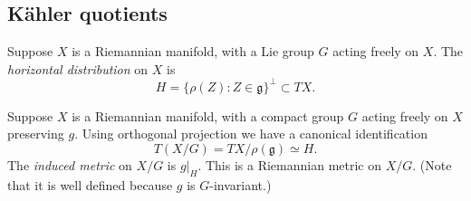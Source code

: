 \documentclass[12pt,letterpaper,reqno]{article}
\numberwithin{equation}{section}
\newcommand{\fg}{{\mathfrak g}}
\newcommand{\kahler}{K\"ahler\xspace}
\newcommand{\ti}[1]{\textit{#1}}
\newcommand{\fixme}[1]{{\color{orange}{[#1]}}}
\begin{document}


\fixme{...}


\subsection{\kahler quotients}

\begin{defn}
Suppose $X$ is a Riemannian manifold, with a Lie group
$G$ acting freely on $X$.
The \ti{horizontal distribution} on $X$ is
\begin{equation}
  H = \{ \rho(Z): Z \in \fg \}^\perp \subset TX.
\end{equation}
\end{defn}

\begin{defn}
Suppose $X$ is a Riemannian manifold, with a compact group
$G$ acting freely on $X$ preserving $g$.
Using orthogonal projection we have
a canonical identification
\begin{equation}
  T(X/G) = TX / \rho(\fg) \simeq H.
\end{equation}
The \ti{induced metric} on $X/G$ is $g \vert_H$.
This is a Riemannian metric on $X/G$.
(Note that it is well defined
because $g$ is $G$-invariant.)
\end{defn}
\end{document}
